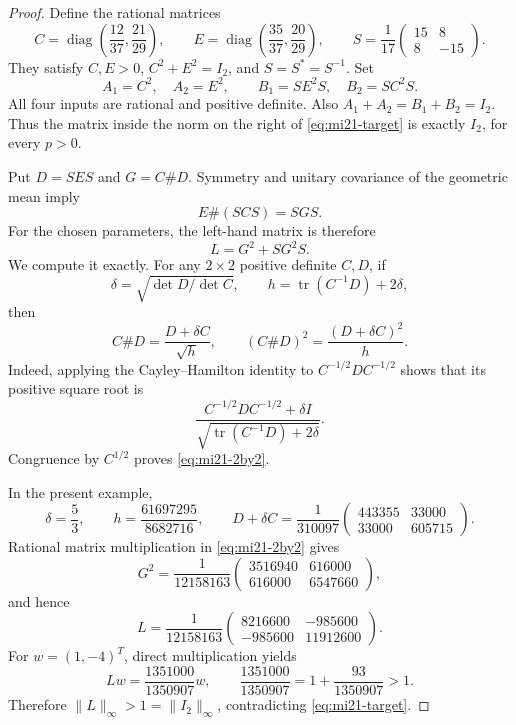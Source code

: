 \documentclass[10pt,a4paper]{article}
\theoremstyle{remark}
\newcommand{\tr}{\operatorname{tr}}
\newcommand{\diag}{\operatorname{diag}}
\newcommand{\opnorm}[1]{\lVert #1\rVert_{\infty}}
\begin{document}
\begin{proof}
Define the rational matrices
\[
 C=\diag\left(\frac{12}{37},\frac{21}{29}\right),\qquad
 E=\diag\left(\frac{35}{37},\frac{20}{29}\right),\qquad
 S=\frac1{17}\begin{pmatrix}15&8\\8&-15\end{pmatrix}.
\]
They satisfy $C,E>0$, $C^2+E^2=I_2$, and $S=S^*=S^{-1}$. Set
\[
 A_1=C^2,\quad A_2=E^2,\qquad
 B_1=SE^2S,\quad B_2=SC^2S.
\]
All four inputs are rational and positive definite. Also
$A_1+A_2=B_1+B_2=I_2$. Thus the matrix inside the norm on the right of \eqref{eq:mi21-target} is exactly $I_2$, for every $p>0$.

Put $D=SES$ and $G=C\#D$. Symmetry and unitary covariance of the geometric mean imply
\[
 E\#(SCS)=SGS.
\]
For the chosen parameters, the left-hand matrix is therefore
\[
 L=G^2+SG^2S.
\]
We compute it exactly. For any $2\times2$ positive definite $C,D$, if
\[
 \delta=\sqrt{\det D/\det C},\qquad h=\tr(C^{-1}D)+2\delta,
\]
then
\begin{equation}\label{eq:mi21-2by2}
 C\#D=\frac{D+\delta C}{\sqrt h},\qquad
 (C\#D)^2=\frac{(D+\delta C)^2}{h}.
\end{equation}
Indeed, applying the Cayley--Hamilton identity to $C^{-1/2}DC^{-1/2}$ shows that its positive square root is
\[
 \frac{C^{-1/2}DC^{-1/2}+\delta I}{\sqrt{\tr(C^{-1}D)+2\delta}}.
\]
Congruence by $C^{1/2}$ proves \eqref{eq:mi21-2by2}.

In the present example,
\[
 \delta=\frac53,\qquad
 h=\frac{61697295}{8682716},\qquad
 D+\delta C=\frac1{310097}
 \begin{pmatrix}443355&33000\\33000&605715\end{pmatrix}.
\]
Rational matrix multiplication in \eqref{eq:mi21-2by2} gives
\[
 G^2=\frac1{12158163}
 \begin{pmatrix}3516940&616000\\616000&6547660\end{pmatrix},
\]
and hence
\begin{equation}\label{eq:mi21-L}
 L=\frac1{12158163}
 \begin{pmatrix}8216600&-985600\\-985600&11912600\end{pmatrix}.
\end{equation}
For $w=(1,-4)^T$, direct multiplication yields
\[
 Lw=\frac{1351000}{1350907}w,
 \qquad\frac{1351000}{1350907}=1+\frac{93}{1350907}>1.
\]
Therefore $\opnorm{L}>1=\opnorm{I_2}$, contradicting \eqref{eq:mi21-target}.
\end{proof}
\end{document}
